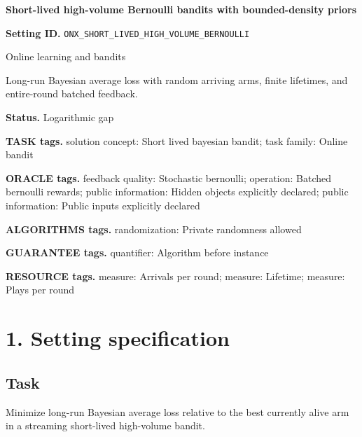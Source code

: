 \documentclass[10pt,a4paper]{article}
\begin{document}
\raggedright

{\LARGE\bfseries\sffamily\color{AtlasNavy} Short-lived high-volume Bernoulli bandits with bounded-density priors\par}\vspace{5pt}


\textbf{Setting ID.} \texttt{ONX\_\allowbreak{}SHORT\_\allowbreak{}LIVED\_\allowbreak{}HIGH\_\allowbreak{}VOLUME\_\allowbreak{}BERNOULLI}



Online learning and bandits



Long-run Bayesian average loss with random arriving arms, finite lifetimes, and entire-round batched feedback.



\textbf{Status.} Logarithmic gap



\textbf{TASK tags.} solution concept: Short lived bayesian bandit; task family: Online bandit



\textbf{ORACLE tags.} feedback quality: Stochastic bernoulli; operation: Batched bernoulli rewards; public information: Hidden objects explicitly declared; public information: Public inputs explicitly declared



\textbf{ALGORITHMS tags.} randomization: Private randomness allowed



\textbf{GUARANTEE tags.} quantifier: Algorithm before instance



\textbf{RESOURCE tags.} measure: Arrivals per round; measure: Lifetime; measure: Plays per round



\section{1. Setting specification}


\subsection{Task}


Minimize long-run Bayesian average loss relative to the best currently alive arm in a streaming short-lived high-volume bandit.
\end{document}
